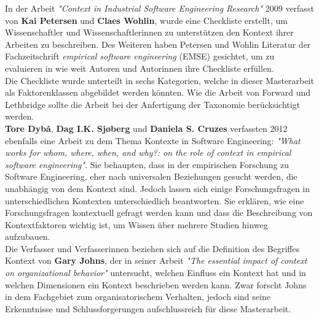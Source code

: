 In der Arbeit \textit{"Context in Industrial Software Engineering Research"} 2009 verfasst von \textbf{Kai Petersen} und \textbf{Claes Wohlin}, wurde eine Checkliste erstellt, um Wissenschaftler und Wissenschaftlerinnen zu unterstützen den Kontext ihrer Arbeiten zu beschreiben. \cite{contextIndustrialSE} Des Weiteren haben Petersen und Wohlin Literatur der Fachzeitschrift \textit{empirical software engineering} (EMSE) gesichtet, um zu evaluieren in wie weit Autoren und Autorinnen ihre Checkliste erfüllen. \\
Die Checkliste wurde unterteilt in sechs Kategorien, welche in dieser Masterarbeit als Faktorenklassen abgebildet werden könnten. Wie die Arbeit von Forward und Lethbridge sollte die Arbeit bei der Anfertigung der Taxonomie berücksichtigt werden. \\

\textbf{Tore Dyb\r{a}}, \textbf{Dag I.K. Sj\o{}berg} und \textbf{Daniela S. Cruzes} verfassten 2012 ebenfalls eine Arbeit zu dem Thema Kontexte in Software Engineering: \textit{"What works for whom, where, when, and why?: on the role of context in empirical software engineering"}. \cite{contextEmpiSE} Sie behaupten, dass in der empirischen Forschung zu Software Engineering, eher nach universalen Beziehungen gesucht werden, die unabhängig von dem Kontext sind. Jedoch lassen sich einige Forschungsfragen in unterschiedlichen Kontexten unterschiedlich beantworten. Sie erklären, wie eine Forschungsfragen kontextuell gefragt werden kann und dass die Beschreibung von Kontextfaktoren wichtig ist, um Wissen über mehrere Studien hinweg aufzubauen. \\
Die Verfasser und Verfasserinnen beziehen sich auf die Definition des Begriffes Kontext von \textbf{Gary Johns}, der in seiner Arbeit \textit{"The essential impact of context on organizational behavior"} untersucht, welchen Einfluss ein Kontext hat und in welchen Dimensionen ein Kontext beschrieben werden kann. \cite{impactContext}  Zwar forscht Johns in dem Fachgebiet zum organisatorischem Verhalten, jedoch sind seine Erkenntnisse und Schlussforgerungen aufschlussreich für diese Masterarbeit. \\
